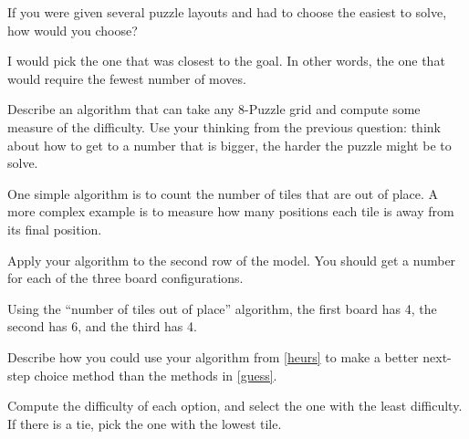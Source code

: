 \Q If you were given several puzzle layouts and had to choose the easiest to solve, how would you choose?

\begin{answer}
I would pick the one that was closest to the goal.
In other words, the one that would require the fewest number of moves.
\end{answer}


\Q \label{heurs} Describe an algorithm that can take any 8-Puzzle grid and compute some measure of the difficulty.
Use your thinking from the previous question: think about how to get to a number that is bigger, the harder the puzzle might be to solve.

\begin{answer}
One simple algorithm is to count the number of tiles that are out of place.
A more complex example is to measure how many positions each tile is away from its final position.
\end{answer}


\Q Apply your algorithm to the second row of the model. You should get a number for each of the three board configurations.

\begin{answer}[6em]
Using the ``number of tiles out of place'' algorithm, the first board has 4, the second has 6, and the third has 4.
\end{answer}


\Q Describe how you could use your algorithm from \ref{heurs} to make a better next-step choice method than the methods in \ref{guess}.

\begin{answer}
Compute the difficulty of each option, and select the one with the least difficulty.
If there is a tie, pick the one with the lowest tile.
\end{answer}
